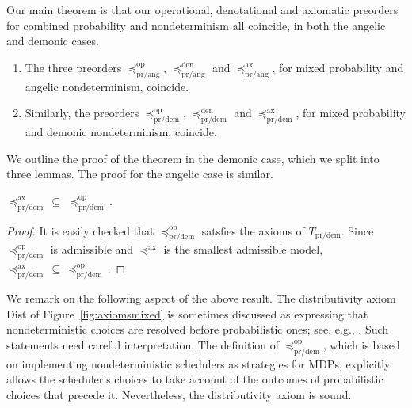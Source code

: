 \documentclass[a4paper,UKenglish]{lipics-v2018}
\newcommand{\Basicleq}{\preccurlyeq}
\newcommand{\prang}{\text{pr/ang}}
\newcommand{\prdem}{\text{pr/dem}}
\newcommand{\Op}{\text{op}}
\newcommand{\Den}{\text{den}}
\newcommand{\Ax}{\text{ax}}
\theoremstyle{plain}
\begin{document}
Our main theorem is that our operational, denotational and axiomatic preorders for combined probability and nondeterminism all coincide, in both the angelic and demonic cases.
\begin{theorem} \leavevmode
\begin{enumerate} 
\item The three preorders $\Basicleq^\Op_\prang$, $\Basicleq^\Den_\prang$ and $\Basicleq^\Ax_\prang$, for mixed probability and angelic nondeterminism, coincide.

\item Similarly, the preorders $\Basicleq^\Op_\prdem$, $\Basicleq^\Den_\prdem$ and $\Basicleq^\Ax_\prdem$,
for mixed probability and demonic nondeterminism, coincide.
\end{enumerate}
\end{theorem}

\noindent
We outline the proof of the theorem in the demonic case, which we split into three lemmas. The proof for the angelic case is similar. 
\begin{lemma}
${\Basicleq^\Ax_\prdem} \, \subseteq \, \, \Basicleq^\Op_\prdem\,$.
\end{lemma}
\begin{proof}
 It is easily checked that $\Basicleq^\Op_\prdem$ satsfies the axioms
 of $T_\prdem$.  Since $\Basicleq^\Op_\prdem$ is admissible and 
$\Basicleq^\Ax$ is the smallest admissible model, ${\Basicleq^\Ax_\prdem} \, \subseteq \, \Basicleq^\Op_\prdem\,$.
\end{proof}
%
\noindent
We remark on the following aspect of the above result.
The distributivity axiom Dist of Figure~\ref{fig:axiomsmixed} is sometimes discussed as expressing that  nondeterministic choices  are  resolved before probabilistic ones; see, e.g., \cite{mislove2004axioms,KeimelP2016}. Such statements need careful interpretation. 
The definition of $\Basicleq^\Op_\prdem$, which is based on implementing nondeterministic schedulers as strategies for MDPs,
explicitly allows the  scheduler's choices to take account of the outcomes of probabilistic choices that precede it. Nevertheless, the distributivity axiom is sound.
\end{document}
